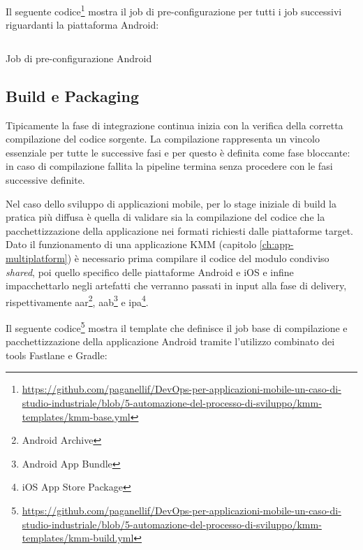 Il seguente codice\footnote{\href{https://github.com/paganellif/DevOps-per-applicazioni-mobile-un-caso-di-studio-industriale/blob/5-automazione-del-processo-di-sviluppo/kmm-templates/kmm-base.yml}{https://github.com/paganellif/DevOps-per-applicazioni-mobile-un-caso-di-studio-industriale/blob/5-automazione-del-processo-di-sviluppo/kmm-templates/kmm-base.yml}} mostra il job di pre-configurazione per tutti i job successivi riguardanti la piattaforma Android:

\begin{listing}[H]
    \inputminted{yaml}{code/pre-android-job.yaml}
    \caption{Job di pre-configurazione Android}
\end{listing}

\subsection{Build e Packaging}
Tipicamente la fase di integrazione continua inizia con la verifica della corretta compilazione del codice sorgente. La compilazione rappresenta un vincolo essenziale per tutte le successive fasi e per questo è definita come fase bloccante: in caso di compilazione fallita la pipeline termina senza procedere con le fasi successive definite.

Nel caso dello sviluppo di applicazioni mobile, per lo stage iniziale di build la pratica più diffusa è quella di validare sia la compilazione del codice che la pacchettizzazione della applicazione nei formati richiesti dalle piattaforme target. Dato il funzionamento di una applicazione KMM (capitolo \ref{ch:app-multiplatform}) è necessario prima compilare il codice del modulo condiviso \textit{shared}, poi quello specifico delle piattaforme Android e iOS e infine impacchettarlo negli artefatti che verranno passati in input alla fase di delivery, rispettivamente aar\footnote{Android Archive}, aab\footnote{Android App Bundle} e ipa\footnote{iOS App Store Package}.

Il seguente codice\footnote{\href{https://github.com/paganellif/DevOps-per-applicazioni-mobile-un-caso-di-studio-industriale/blob/5-automazione-del-processo-di-sviluppo/kmm-templates/kmm-build.yml}{https://github.com/paganellif/DevOps-per-applicazioni-mobile-un-caso-di-studio-industriale/blob/5-automazione-del-processo-di-sviluppo/kmm-templates/kmm-build.yml}} mostra il template che definisce il job base di compilazione e pacchettizzazione della applicazione Android tramite l'utilizzo combinato dei tools Fastlane e Gradle:

